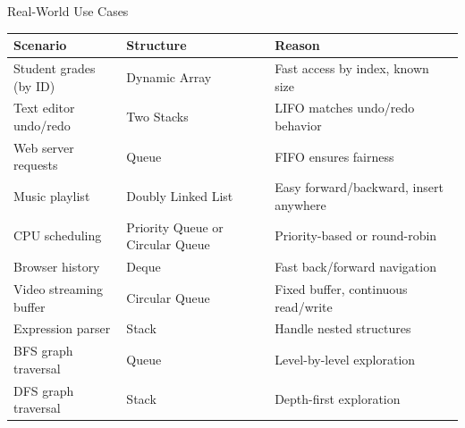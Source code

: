 \documentclass[aspectratio=169,xcolor=dvipsnames]{beamer}
\begin{document}
\begin{frame}{Real-World Use Cases}
  \begin{center}
    \begin{tabular}{p{4cm}|p{3cm}|p{4cm}}
      \toprule
      \textbf{Scenario} & \textbf{Structure} & \textbf{Reason} \\
      \midrule
      Student grades (by ID) & Dynamic Array & Fast access by index, known size \\
      \midrule
      Text editor undo/redo & Two Stacks & LIFO matches undo/redo behavior \\
      \midrule
      Web server requests & Queue & FIFO ensures fairness \\
      \midrule
      Music playlist & Doubly Linked List & Easy forward/backward, insert anywhere \\
      \midrule
      CPU scheduling & Priority Queue or Circular Queue & Priority-based or round-robin \\
      \midrule
      Browser history & Deque & Fast back/forward navigation \\
      \midrule
      Video streaming buffer & Circular Queue & Fixed buffer, continuous read/write \\
      \midrule
      Expression parser & Stack & Handle nested structures \\
      \midrule
      BFS graph traversal & Queue & Level-by-level exploration \\
      \midrule
      DFS graph traversal & Stack & Depth-first exploration \\
      \bottomrule
    \end{tabular}
  \end{center}
\end{frame}
\end{document}

